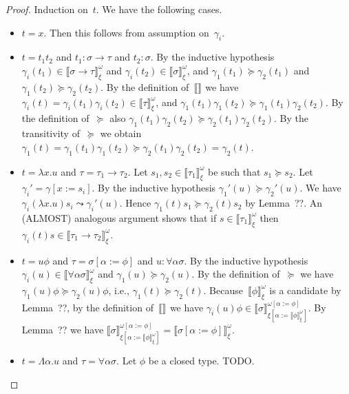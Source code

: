 \documentclass[runningheads,a4paper]{llncs}
\newcommand{\arrtype}{\rightarrow}
\newcommand{\abs}[2]{\lambda #1.#2}
\newcommand{\tabs}[2]{\Lambda #1.#2}
\newcommand{\subst}[2]{#1:=#2}
\newcommand{\val}[3]{\ensuremath{\llbracket#1\rrbracket_{#2}^{#3}}}
\begin{document}
\begin{proof}
  Induction on~$t$. We have the following cases.
  \begin{itemize}
  \item $t = x$. Then this follows from assumption on~$\gamma_i$.
  \item $t = t_1 t_2$ and $t_1 : \sigma\arrtype\tau$ and $t_2 :
    \sigma$. By the inductive hypothesis $\gamma_i(t_1) \in
    \val{\sigma\arrtype\tau}{\xi}{\omega}$ and $\gamma_i(t_2) \in
    \val{\sigma}{\xi}{\omega}$, and $\gamma_1(t_1) \succeq
    \gamma_2(t_1)$ and $\gamma_1(t_2) \succeq \gamma_2(t_2)$. By the
    definition of~$\val{}{}{}$ we have $\gamma_i(t) =
    \gamma_i(t_1)\gamma_i(t_2) \in \val{\tau}{\xi}{\omega}$, and
    $\gamma_1(t_1)\gamma_1(t_2) \succeq
    \gamma_1(t_1)\gamma_2(t_2)$. By the definition of~$\succeq$ also
    $\gamma_1(t_1)\gamma_2(t_2)\succeq\gamma_2(t_1)\gamma_2(t_2)$. By
    the transitivity of~$\succeq$ we obtain $\gamma_1(t) =
    \gamma_1(t_1)\gamma_1(t_2) \succeq \gamma_2(t_1)\gamma_2(t_2) =
    \gamma_2(t)$.
  \item $t = \abs{x}{u}$ and $\tau=\tau_1\arrtype\tau_2$. Let $s_1,s_2
    \in \val{\tau_1}{\xi}{\omega}$ be such that $s_1 \succeq s_2$. Let
    $\gamma_i'=\gamma[\subst{x}{s_i}]$. By the inductive hypothesis
    $\gamma_1'(u)\succeq\gamma_2'(u)$. We have $\gamma_i(\abs{x}{u})
    s_i \leadsto \gamma_i'(u)$. Hence $\gamma_1(t) s_1 \succeq
    \gamma_2(t) s_2$ by Lemma~??. An (ALMOST) analogous argument shows
    that if $s \in \val{\tau_1}{\xi}{\omega}$ then $\gamma_i(t) s \in
    \val{\tau_1\arrtype\tau_2}{\xi}{\omega}$.
  \item $t = u \phi$ and $\tau = \sigma[\subst{\alpha}{\phi}]$ and $u
    : \forall\alpha\sigma$. By the inductive hypothesis $\gamma_i(u)
    \in \val{\forall\alpha\sigma}{\xi}{\omega}$ and $\gamma_1(u)
    \succeq \gamma_2(u)$. By the definition of~$\succeq$ we have
    $\gamma_1(u) \phi \succeq \gamma_2(u) \phi$, i.e., $\gamma_1(t)
    \succeq \gamma_2(t)$. Because~$\val{\phi}{\xi}{\omega}$ is a
    candidate by Lemma~??, by the definition of~$\val{}{}{}$ we have
    $\gamma_i(u) \phi \in
    \val{\sigma}{\xi[\subst{\alpha}{\val{\phi}{\xi}{\omega}}]}{\omega[\subst{\alpha}{\phi}]}$. By
    Lemma~?? we have
    $\val{\sigma}{\xi[\subst{\alpha}{\val{\phi}{\xi}{\omega}}]}{\omega[\subst{\alpha}{\phi}]}
    = \val{\sigma[\subst{\alpha}{\phi}]}{\xi}{\omega}$.
  \item $t = \tabs{\alpha}{u}$ and $\tau = \forall\alpha\sigma$. Let
    $\phi$ be a closed type. TODO.
  \end{itemize}
\end{proof}
\end{document}
